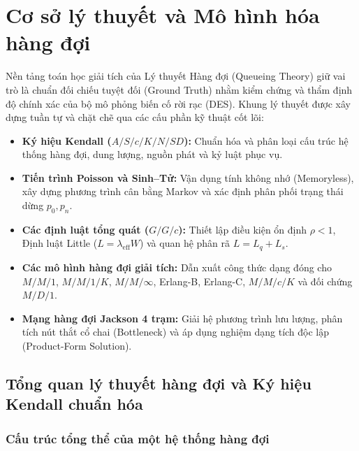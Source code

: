 \section{Cơ sở lý thuyết và Mô hình hóa hàng đợi}
\label{sec:mo-hinh}
\hspace{0.5cm}Nền tảng toán học giải tích của Lý thuyết Hàng đợi (Queueing Theory) giữ vai trò là chuẩn đối chiếu tuyệt đối (Ground Truth) nhằm kiểm chứng và thẩm định độ chính xác của bộ mô phỏng biến cố rời rạc (DES). Khung lý thuyết được xây dựng tuần tự và chặt chẽ qua các cấu phần kỹ thuật cốt lõi:\begin{itemize}[leftmargin=1.5em]
    \item \textbf{Ký hiệu Kendall ($A/S/c/K/N/SD$):} Chuẩn hóa và phân loại cấu trúc hệ thống hàng đợi, dung lượng, nguồn phát và kỷ luật phục vụ.

    \item \textbf{Tiến trình Poisson và Sinh--Tử:} Vận dụng tính không nhớ (Memoryless), xây dựng phương trình cân bằng Markov và xác định phân phối trạng thái dừng $p_0, p_n$.

    \item \textbf{Các định luật tổng quát ($G/G/c$):} Thiết lập điều kiện ổn định $\rho < 1$, Định luật Little ($L = \lambda_{\text{eff}}W$) và quan hệ phân rã $L = L_q + L_s$.

    \item \textbf{Các mô hình hàng đợi giải tích:} Dẫn xuất công thức dạng đóng cho $M/M/1$, $M/M/1/K$, $M/M/\infty$, Erlang-B, Erlang-C, $M/M/c/K$ và đối chứng $M/D/1$.

    \item \textbf{Mạng hàng đợi Jackson 4 trạm:} Giải hệ phương trình lưu lượng, phân tích nút thắt cổ chai (Bottleneck) và áp dụng nghiệm dạng tích độc lập (Product-Form Solution).
\end{itemize}

\subsection{Tổng quan lý thuyết hàng đợi và Ký hiệu Kendall chuẩn hóa}
\label{subsec:ly-thuyet-kendall}

\subsubsection{Cấu trúc tổng thể của một hệ thống hàng đợi}

